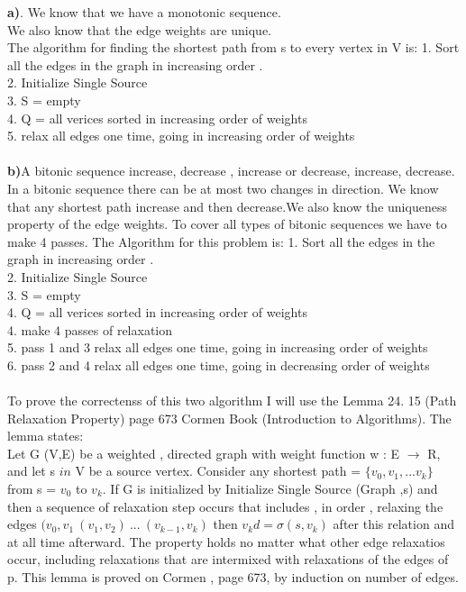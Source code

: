 \documentclass[11 pt]{article}
\begin{document}
 \textbf{a)}. We know that we have a monotonic sequence.\\
 We also know that the edge weights are unique.\\
 The algorithm for finding the shortest path from s to every vertex in V is:
 1. Sort all the edges in the graph in increasing order .\\
 2. Initialize Single Source \\
 3. S = empty\\
 4. Q = all verices sorted in increasing order of weights\\
 5. relax all edges one time, going in increasing order of weights\\ \\
 \textbf{b)}A bitonic sequence increase, decrease , increase or decrease, increase, decrease. In a bitonic sequence there can be at most two changes in direction. We know that any shortest path increase and then decrease.We also know the uniqueness property of the edge weights. To cover all types of bitonic sequences we have to make  4 passes. The Algorithm for this problem is:  
 1. Sort all the edges in the graph in increasing order .\\
 2. Initialize Single Source \\
 3. S = empty\\
 4. Q = all verices sorted in increasing order of weights\\
 4. make 4 passes of relaxation\\
 5.  pass 1 and 3 relax all edges one time, going in increasing order of weights\\
 6. pass 2 and 4 relax all edges one time, going in decreasing order of weights\\ \\
 
 To prove the correctenss of this two algorithm I will use the Lemma 24. 15 (Path Relaxation Property) page 673 Cormen Book (Introduction to Algorithms). The lemma states:\\
 
 Let G (V,E) be a weighted , directed graph with weight function w : E $\rightarrow$ R, and let s $in $ V be a source vertex. Consider any shortest path = $\{ v_0, v_1, ... v_k\}$ from s = $v_0$ to $v_k$. If G is initialized by Initialize Single Source (Graph ,s) and then a sequence of relaxation step occurs that includes , in order , relaxing the edges $(v_0, v_1 \ (v_1,v_2) \  ... \ (v_{k-1} , v_k)$ then $v_k d = \sigma (s, v_k)$ after this relation and at all time afterward. The property holds no matter what other edge relaxatios occur, including relaxations that are intermixed with relaxations of the edges of p. This lemma is proved on Cormen , page 673, by induction on number of edges.  
 
\end{document}

